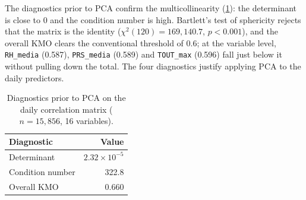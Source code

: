 The diagnostics prior to PCA confirm the multicollinearity
(\cref{tab:diagnostico-pca}): the determinant is close to 0 and the condition
number is high. Bartlett's test of sphericity rejects that the matrix is the
identity ($\chi^2(120)=169{,}140.7$, $p<0.001$), and the overall KMO clears
the conventional threshold of 0.6; at the variable level, \texttt{RH\_media}
(0.587), \texttt{PRS\_media} (0.589) and \texttt{TOUT\_max} (0.596) fall just
below it without pulling down the total. The four diagnostics justify
applying PCA to the daily predictors.

\begin{table}[pos=t]
  \centering
  \caption{Diagnostics prior to PCA on the daily correlation matrix
    ($n=15{,}856$, 16 variables).}
  \label{tab:diagnostico-pca}
  \small
  \begin{tabular}{lr}
    \toprule
    Diagnostic          & Value \\
    \midrule
    Determinant         & $2.32\times10^{-5}$ \\
    Condition number    & 322.8 \\
    Overall KMO         & 0.660 \\
    \bottomrule
  \end{tabular}
\end{table}
